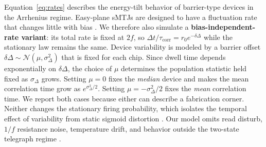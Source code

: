 \documentclass[journal]{IEEEtran}
\newcommand{\rzero}{r_0}
\newcommand{\tauc}{\tau_{\mathrm{corr}}}
\begin{document}
Equation~\eqref{eq:rates} describes the energy-tilt behavior of
barrier-type devices in the Arrhenius regime. Easy-plane sMTJs are designed
to have a fluctuation rate that changes little with bias
\cite{safranski2021nanosecond,sun2026superparamagnetic}. We therefore also
simulate a \textbf{bias-independent-rate variant}: its total rate is fixed
at $2f$, so $\Delta t/\tauc=\rzero e^{-\delta\Delta}$ while the stationary
law remains the same. Device variability is modeled by a barrier offset
$\delta\Delta\sim\mathcal{N}(\mu,\sigma_\Delta^2)$ that is fixed for each
chip. Since dwell time depends exponentially on $\delta\Delta$, the choice
of $\mu$ determines the population statistic held fixed as
$\sigma_\Delta$ grows. Setting $\mu=0$ fixes the \emph{median} device and
makes the mean correlation time grow as $e^{\sigma_\Delta^2/2}$. Setting
$\mu=-\sigma_\Delta^2/2$ fixes the \emph{mean} correlation time. We report
both cases because either can describe a fabrication corner. Neither changes
the stationary firing probability, which isolates the temporal effect of
variability from static sigmoid distortion
\cite{wood2020modular,zand2018composable,zhang2025automatic}. Our model
omits read disturb, $1/f$ resistance noise, temperature drift, and behavior
outside the two-state telegraph regime
\cite{safranski2021nanosecond,hayakawa2021nanosecond}.
\end{document}

